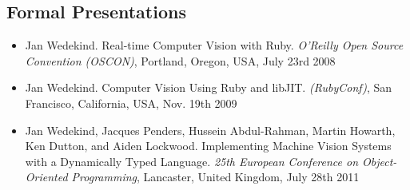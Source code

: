 \documentclass[12pt,a4paper,oneside,openright]{book}
\begin{document}
\begin{CJK}{UTF8}{}
\section*{Formal Presentations}
\begin{itemize}
\item Jan Wedekind. Real-time Computer Vision with Ruby. \emph{O'Reilly Open Source Convention (OSCON)}, Portland, Oregon, USA, July 23rd 2008~\citep{w2008}
\item Jan Wedekind. Computer Vision Using Ruby and libJIT. \emph{(RubyConf)}, San Francisco, California, USA, Nov. 19th 2009~\citep{w2009}
\item Jan Wedekind, Jacques Penders, Hussein Abdul-Rahman, Martin Howarth, Ken Dutton, and Aiden Lockwood. Implementing Machine Vision Systems with a Dynamically Typed Language. \emph{25th European Conference on Object-Oriented Programming}, Lancaster, United Kingdom, July 28th 2011~\citep{w2011}
\end{itemize}


\end{CJK}
\end{document}
